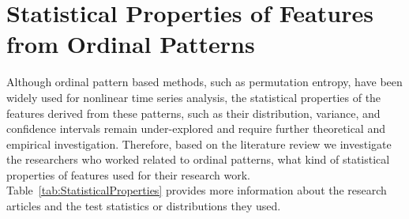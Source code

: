 \section{Statistical Properties of Features from Ordinal Patterns}\label{Sec:StatisitcalProperty}

Although ordinal pattern based methods, such as permutation entropy, have been widely used for nonlinear time series analysis, the statistical properties of the features derived from these patterns, such as their distribution, variance, and confidence intervals remain under-explored and require further theoretical and empirical investigation. Therefore, based on the literature review we investigate the researchers who worked related to ordinal patterns, what kind of statistical properties of features used for their research work. Table~\ref{tab:StatisticalProperties} provides more information about the research articles and the test statistics or distributions they used.


